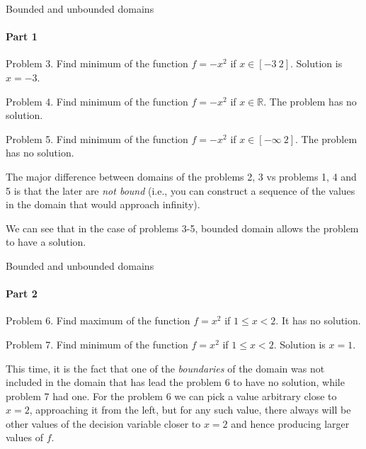 \documentclass{beamer}
\begin{document}
\begin{frame}{Bounded and unbounded domains}
\framesubtitle{Part 1}
\begin{flushleft}

Problem 3. Find minimum of the function $f = -x^2$ if $x \in [-3 \ 2]$. Solution is $x = -3$.

\bigskip

Problem 4. Find minimum of the function $f = -x^2$ if $x \in \mathbb{R}$. The problem has no solution.

\bigskip

Problem 5. Find minimum of the function $f = -x^2$ if $x \in  [-\infty \ 2]$. The problem has no solution.

\bigskip

The major difference between domains of the problems 2, 3 vs problems 1, 4 and 5 is that the later are \emph{not bound} (i.e., you can construct a sequence of the values in the domain that would approach infinity).

\bigskip

We can see that in the case of problems 3-5, bounded domain allows the problem to have a solution.
 
\end{flushleft}
\end{frame}



\begin{frame}{Bounded and unbounded domains}
\framesubtitle{Part 2}
\begin{flushleft}

Problem 6. Find maximum of the function $f = x^2$ if $1 \leq x < 2$. It has no solution.

\bigskip

Problem 7. Find minimum of the function $f = x^2$ if $1 \leq x < 2$. Solution is $x = 1$.

\bigskip

This time, it is the fact that one of the \emph{boundaries} of the domain was not included in the domain that has lead the problem 6 to have no solution, while problem 7 had one. For the problem 6 we can pick a value arbitrary close to $x = 2$, approaching it from the left, but for any such value, there always will be other values of the decision variable closer to $x = 2$ and hence producing larger values of $f$.
 
\end{flushleft}
\end{frame}
\end{document}
